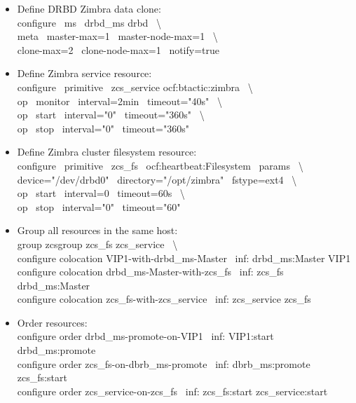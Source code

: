 \documentclass[a4paper, 12pt]{book}
\begin{document}
\begin{itemize}
	\item Define DRBD Zimbra data clone:\\
		configure \ ms \ drbd\_ms drbd \ \textbackslash \\
		meta \ master-max=1 \ master-node-max=1 \ \textbackslash \\
		clone-max=2 \ clone-node-max=1 \ notify=true
\end{itemize}

\begin{itemize}
	\item Define Zimbra service resource:\\
		configure \ primitive \ zcs\_service ocf:btactic:zimbra \ \textbackslash \\
		op \ monitor \ interval=2min \ timeout="40s" \ \textbackslash \\
		op \ start \ interval="0" \ timeout="360s" \ \textbackslash \\
		op \ stop \ interval="0" \ timeout="360s"
\end{itemize}

\begin{itemize}
	\item Define Zimbra cluster filesystem resource:\\
		configure \ primitive \ zcs\_fs \ ocf:heartbeat:Filesystem \ params \ \textbackslash \\ 
		device="/dev/drbd0" \ directory="/opt/zimbra" \ fstype=ext4 \ \textbackslash \\
		op \ start \ interval=0 \ timeout=60s \ \textbackslash \\
		op \ stop \ interval="0" \ timeout="60"
\end{itemize}

\begin{itemize}
	\item Group all resources in the same host:\\
		group zcsgroup zcs\_fs zcs\_service \ \textbackslash \\
		configure colocation VIP1-with-drbd\_ms-Master \ inf: drbd\_ms:Master VIP1 \\
		configure colocation drbd\_ms-Master-with-zcs\_fs \ inf: zcs\_fs drbd\_ms:Master \\
		configure colocation zcs\_fs-with-zcs\_service \ inf: zcs\_service zcs\_fs
\end{itemize}

\begin{itemize}
	\item Order resources:\\
		configure order drbd\_ms-promote-on-VIP1 \ inf: VIP1:start drbd\_ms:promote\\
		configure order zcs\_fs-on-dbrb\_ms-promote \ inf: dbrb\_ms:promote zcs\_fs:start\\
		configure order zcs\_service-on-zcs\_fs \ inf: zcs\_fs:start zcs\_service:start
\end{itemize}
\end{document}
